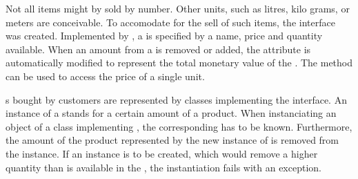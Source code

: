 Not all items might by sold by number.
Other units, such as litres, kilo grams, or meters are conceivable.
To accomodate for the sell of such items, the  interface was created.
Implemented by , a  is specified by a name, price and quantity available.
When an amount from a  is removed or added, the  attribute is automatically modified to represent the total monetary value of the .
The  method can be used to access the price of a single unit.

s bought by customers are represented by classes implementing the  interface.
An instance of a  stands for a certain amount of a product.
When instanciating an object of a class implementing , the corresponding  has to be known.
Furthermore, the amount of the product represented by the new instance of  is removed from the  instance.
If an instance is to be created, which would remove a higher quantity than is available in the , the instantiation fails with an exception.

